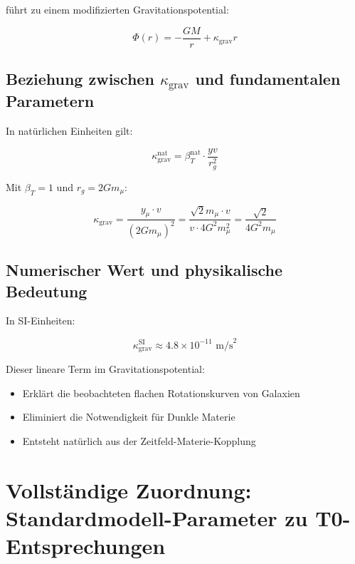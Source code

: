 	führt zu einem modifizierten Gravitationspotential:
	
	\begin{equation}
		\Phi(r) = -\frac{GM}{r} + \kappa_{\text{grav}} r
	\end{equation}
	
	\subsection{Beziehung zwischen $\kappa_{\text{grav}}$ und fundamentalen Parametern}
	
	In natürlichen Einheiten gilt:
	
	\begin{equation}
		\kappa_{\text{grav}}^{\text{nat}} = \beta_T^{\text{nat}} \cdot \frac{yv}{r_g^2}
	\end{equation}
	
	Mit $\beta_T = 1$ und $r_g = 2Gm_\mu$:
	
	\begin{equation}
		\kappa_{\text{grav}} = \frac{y_\mu \cdot v}{(2Gm_\mu)^2} = \frac{\sqrt{2} m_\mu \cdot v}{v \cdot 4G^2m_\mu^2} = \frac{\sqrt{2}}{4G^2m_\mu}
	\end{equation}
	
	\subsection{Numerischer Wert und physikalische Bedeutung}
	
	In SI-Einheiten:
	
	\begin{equation}
		\kappa_{\text{grav}}^{\text{SI}} \approx 4.8 \times 10^{-11} \text{ m/s}^2
	\end{equation}
	
	Dieser lineare Term im Gravitationspotential:
	\begin{itemize}
		\item Erklärt die beobachteten flachen Rotationskurven von Galaxien
		\item Eliminiert die Notwendigkeit für Dunkle Materie
		\item Entsteht natürlich aus der Zeitfeld-Materie-Kopplung
	\end{itemize}
	
\section{Vollständige Zuordnung: Standardmodell-Parameter zu T0-Entsprechungen}
\label{sec:sm_t0_mapping}

